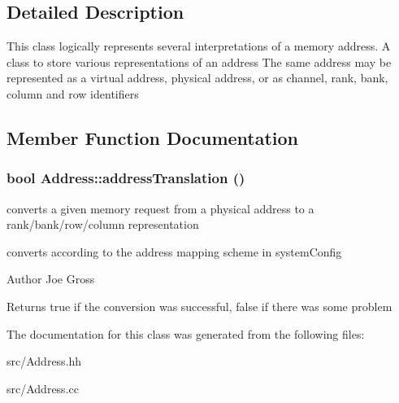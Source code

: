 \subsection{Detailed Description}
This class logically represents several interpretations of a memory address. A class to store various representations of an address The same address may be represented as a virtual address, physical address, or as channel, rank, bank, column and row identifiers 

\subsection{Member Function Documentation}
\subsubsection[{addressTranslation}]{\setlength{\rightskip}{0pt plus 5cm}bool Address::addressTranslation ()\hspace{0.3cm}{\ttfamily  [protected]}}\label{class_d_r_a_msim_i_i_1_1_address_ad4039f830c5947b91ceb40b8c54503bc}


converts a given memory request from a physical address to a rank/bank/row/column representation 

converts according to the address mapping scheme in systemConfig \begin{DoxyAuthor}{Author}
Joe Gross 
\end{DoxyAuthor}
\begin{DoxyReturn}{Returns}
true if the conversion was successful, false if there was some problem 
\end{DoxyReturn}


The documentation for this class was generated from the following files:\begin{DoxyCompactItemize}
\item 
src/Address.hh\item 
src/Address.cc\end{DoxyCompactItemize}
